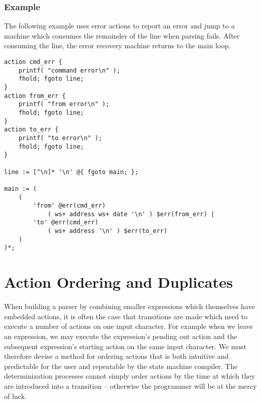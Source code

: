 \documentclass[letterpaper,11pt,oneside]{book}
\newenvironment{inline_code}{\def\baselinestretch{1}\vspace{12pt}\small}{}
\begin{document}
\begin{comment}
\begin{itemize}
\setlength{\parskip}{0in}
\item \verb|expr >^ (name, action) | -- Start state.
\item \verb|expr $^ (name, action) | -- All states.
\item \verb|expr %^ (name, action) | -- Final states.
\item \verb|expr <^ (name, action) | -- Not start state.
\item \verb|expr <>^ (name, action)| -- Not start and not final states.
\end{itemize}
\end{comment}

\subsubsection{Example}

The following example uses error actions to report an error and jump to a
machine which consumes the remainder of the line when parsing fails. After
consuming the line, the error recovery machine returns to the main loop.

\begin{inline_code}
\begin{verbatim}
action cmd_err { 
    printf( "command error\n" ); 
    fhold; fgoto line;
}
action from_err { 
    printf( "from error\n" ); 
    fhold; fgoto line; 
}
action to_err { 
    printf( "to error\n" ); 
    fhold; fgoto line;
}

line := [^\n]* '\n' @{ fgoto main; };

main := (
    (
        'from' @err(cmd_err) 
            ( ws+ address ws+ date '\n' ) $err(from_err) |
        'to' @err(cmd_err)
            ( ws+ address '\n' ) $err(to_err)
    ) 
)*;
\end{verbatim}
\end{inline_code}



\section{Action Ordering and Duplicates}

When building a parser by combining smaller expressions which themselves have
embedded actions, it is often the case that transitions are made which need to
execute a number of actions on one input character. For example when we leave
an expression, we may execute the expression's pending out action and the
subsequent expression's starting action on the same input character.  We must
therefore devise a method for ordering actions that is both intuitive and
predictable for the user and repeatable by the state machine compiler. The
determinization processes cannot simply order actions by the time at which they
are introduced into a transition -- otherwise the programmer will be at the
mercy of luck.
\end{document}
